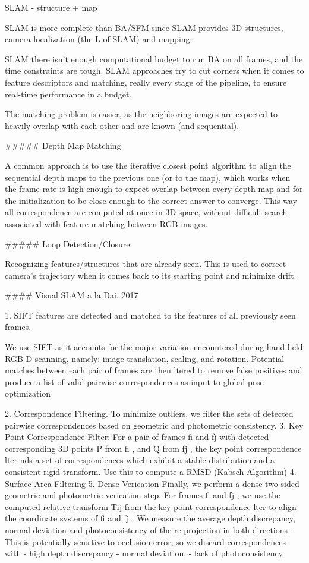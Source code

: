 SLAM - structure + map

SLAM is more complete than BA/SFM since SLAM provides 3D structures, camera localization (the L of SLAM) and mapping.

SLAM there isn’t enough computational budget to run BA on all frames, and the time constraints are tough. SLAM approaches try to cut corners when it comes to feature descriptors and matching, really every stage of the pipeline, to ensure real-time performance in a budget. 

The matching problem is easier, as the  neighboring images are expected to heavily overlap with each other and are known (and sequential).

##### Depth Map Matching

A common approach is to use the iterative closest point algorithm to align the sequential depth maps to the previous one (or to the map), which works when the frame-rate is high enough to expect overlap between every depth-map and for the initialization to be close enough to the correct answer to converge. This way all correspondence are computed at once in 3D space, without difficult search associated with feature matching between RGB images.

##### Loop Detection/Closure

Recognizing features/structures that are already seen. This is used to correct camera's trajectory when it comes back to its starting point and minimize drift.

#### Visual SLAM a la Dai. 2017

1. SIFT features are detected and matched to the features of all previously seen frames. 

We use SIFT as it accounts for the major variation encountered during hand-held RGB-D scanning, namely: image translation, scaling, and rotation. Potential matches between each pair of frames are then ltered to remove false positives and produce a list of valid pairwise correspondences as input to global pose optimization

2. Correspondence Filtering. To minimize outliers, we filter the sets of detected pairwise correspondences based on geometric and photometric consistency.
3. Key Point Correspondence Filter: For a pair of frames fi and fj with detected corresponding 3D points P from fi , and Q from fj , the key point correspondence lter nds a set of correspondences which exhibit a stable distribution and a consistent rigid transform. Use this to compute a RMSD (Kabsch Algorithm)
4. Surface Area Filtering
5. Dense Verication Finally, we perform a dense two-sided geometric and photometric verication step. For frames fi and fj , we use the computed relative transform Tij from the key point correspondence lter to align the coordinate systems of fi and fj . We measure the average depth discrepancy, normal deviation and photoconsistency of the re-projection in both directions
   - This is potentially sensitive to occlusion error, so we discard correspondences with 
   - high depth discrepancy
   - normal deviation,
   - lack of photoconsistency

